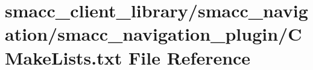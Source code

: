 \hypertarget{smacc__client__library_2smacc__navigation_2smacc__navigation__plugin_2CMakeLists_8txt}{}\section{smacc\+\_\+client\+\_\+library/smacc\+\_\+navigation/smacc\+\_\+navigation\+\_\+plugin/\+C\+Make\+Lists.txt File Reference}
\label{smacc__client__library_2smacc__navigation_2smacc__navigation__plugin_2CMakeLists_8txt}
